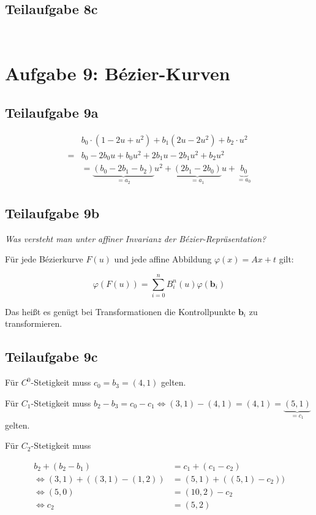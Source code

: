 \documentclass[a4paper]{scrartcl}
\begin{document}
\subsection*{Teilaufgabe 8c}
\inputminted[linenos, numbersep=5pt, tabsize=4, frame=lines, label=shader.vert]{glsl}{shader.vert}

\inputminted[linenos, numbersep=5pt, tabsize=4, frame=lines, label=shader.frag]{glsl}{shader.frag}


\section*{Aufgabe 9: Bézier-Kurven}
\subsection*{Teilaufgabe 9a}

\begin{align}
     & b_0 \cdot (1-2u + u^2) + b_1 (2u - 2u^2) + b_2 \cdot u^2\\
    =& b_0 - 2 b_0 u + b_0 u^2 + 2 b_1 u - 2 b_1 u^2 + b_2 u^2\\
    &= \underbrace{(b_0 - 2 b_1 - b_2)}_{= a_2} u^2  + \underbrace{(2 b_1 - 2 b_0)}_{= a_1} u + \underbrace{b_0}_{= a_0}
\end{align}

\subsection*{Teilaufgabe 9b}
\textit{Was versteht man unter affiner Invarianz der Bézier-Repräsentation?}

Für jede Bézierkurve $F(u)$ und jede affine Abbildung $\varphi(x) = A x + t$ gilt:

\[\varphi(F(u)) = \sum_{i=0}^n B_i^n(u) \varphi(\mathbf{b}_i)\]

Das heißt es genügt bei Transformationen die Kontrollpunkte $\mathbf{b}_i$
zu transformieren.

\subsection*{Teilaufgabe 9c}
Für $C^0$-Stetigkeit muss $c_0 = b_3 = (4, 1)$ gelten.

Für $C_1$-Stetigkeit muss $b_2 - b_3 = c_0 - c_1 \Leftrightarrow (3,1) - (4,1) = (4,1) = \underbrace{(5,1)}_{= c_1}$ gelten.

Für $C_2$-Stetigkeit muss

\begin{align}
    b_2 + (b_2 - b_1) &= c_1 + (c_1 - c_2)\\
    \Leftrightarrow (3,1) + ((3,1) - (1,2)) &= (5,1) + ((5,1) - c_2))\\
    \Leftrightarrow (5, 0) &= (10, 2) - c_2\\
    \Leftrightarrow c_2 &= (5, 2)
\end{align}
\end{document}
